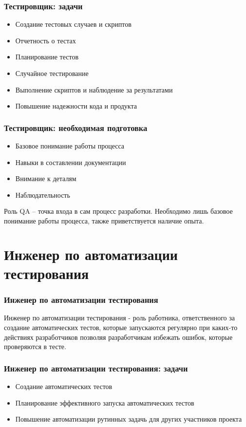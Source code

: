 \documentclass{../industrial-development}
\begin{document}
	\begin{frame} \frametitle{Тестировщик: задачи}
		\begin{itemize}
			\item Создание тестовых случаев и скриптов
			\item Отчетность о тестах
			\item Планирование тестов
			\item Случайное тестирование
			\item Выполнение скриптов и наблюдение за результатами 
			\item Повышение надежности кода и продукта
		\end{itemize}
	\end{frame}
	
	\begin{frame} \frametitle{Тестировщик: необходимая подготовка}
		\begin{itemize}
			\item Базовое понимание работы процесса
			\item Навыки в составлении документации
			\item Внимание к деталям
			\item Наблюдательность 
		\end{itemize}
		\begin{block}{}
			\alert {}Роль QA – точка входа в сам процесс разработки. Необходимо лишь базовое понимание работы процесса, также приветствуется наличие опыта. 
		\end{block}
		
	\end{frame}
		
	\section{Инженер по автоматизации тестирования}
	
	\begin{frame} \frametitle{Инженер по автоматизации тестирования}
		\begin{block}{}
			\alert {Инженер по автоматизации тестирования} - роль работника, ответственного за создание автоматических тестов, которые запускаются регулярно при каких-то действиях разработчиков позволяя разработчикам избежать ошибок, которые проверяются в тесте.
		\end{block}
		
	\end{frame}
	
	\begin{frame} \frametitle{Инженер по автоматизации тестирования: задачи}
			\begin{itemize}
				\item Создание автоматических тестов
				\item Планирование эффективного запуска автоматических тестов
				\item Повышение автоматизации рутинных задачь для других участников проекта		
			\end{itemize}
	\end{frame}
	
\end{document}
